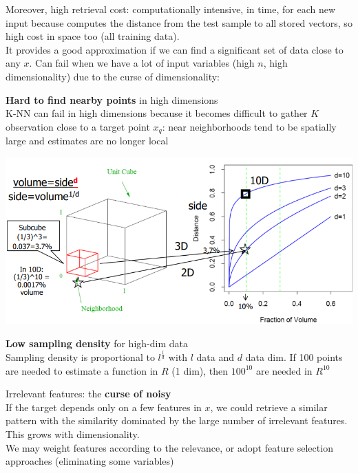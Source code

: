 \documentclass[10pt]{report}
\begin{document}
Moreover, high retrieval cost: computationally intensive, in time, for each new input because computes the distance from the test sample to all stored vectors, so high cost in space too (all training data).\\
It provides a good approximation if we can find a significant set of data close to any $x$. Can fail when we have a lot of input variables (high $n$, high dimensionality) due to the curse of dimensionality:
\begin{list}{}{}
	\item \textbf{Hard to find nearby points} in high dimensions\\
	K-NN can fail in high dimensions because it becomes difficult to gather $K$ observation close to a target point $x_q$: near neighborhoods tend to be spatially large and estimates are no longer local
	\begin{center}
		\includegraphics[scale=0.75]{5.png}
	\end{center}
	\item \textbf{Low sampling density} for high-dim data\\
	Sampling density is proportional to $l^{\frac{l}{d}}$ with $l$ data and $d$ data dim. If 100 points are needed to estimate a function in $R$ (1 dim), then $100^{10}$ are needed in $R^{10}$
	\item Irrelevant features: the \textbf{curse of noisy}\\
	If the target depends only on a few features in $x$, we could retrieve a similar pattern with the similarity dominated by the large number of irrelevant features.\\
	This grows with dimensionality.\\
	We may weight features according to the relevance, or adopt feature selection approaches (eliminating some variables)
\end{list}
\end{document}
